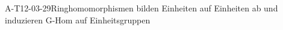 
\begin{PROP}{A-T12-03-29}{Ringhomomorphismen bilden Einheiten auf Einheiten ab und induzieren G-Hom auf Einheitsgruppen}
\end{PROP}
